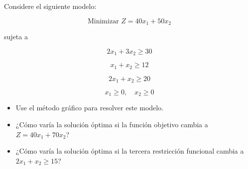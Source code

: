 \begin{Ejer} Considere el siguiente modelo:

\[
\text{Minimizar } Z = 40x_1 + 50x_2
\]

sujeta a

\[
2x_1 + 3x_2 \ge 30
\]

\[
x_1 + x_2 \ge 12
\]

\[
2x_1 + x_2 \ge 20
\]

\[
x_1 \ge 0, \quad x_2 \ge 0
\]

\begin{itemize}
\item[a)] Use el m\'etodo gr\'afico para resolver este modelo.
\item[b)] ¿C\'omo var\'ia la soluci\'on \'optima si la funci\'on objetivo cambia a $Z = 40x_1 + 70x_2$?
\item[c)] ¿C\'omo var\'ia la soluci\'on \'optima si la tercera restricci\'on funcional cambia a $2x_1 + x_2 \ge 15$?
\end{itemize}


\end{Ejer}


